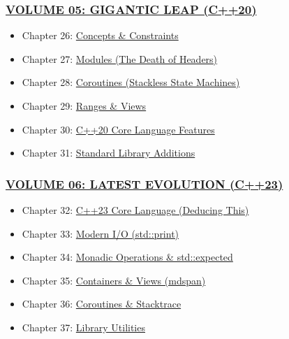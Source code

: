 \hypertarget{volume-05-gigantic-leap-c20}{%
\subsubsection{\texorpdfstring{\protect\hyperlink{volume-05-gigantic-leap-c20}{VOLUME
05: GIGANTIC LEAP
(C++20)}}{VOLUME 05: GIGANTIC LEAP (C++20)}}\label{volume-05-gigantic-leap-c20}}

\begin{itemize}
\tightlist
\item
  Chapter 26: \protect\hyperlink{chapter-26-c20-concepts}{Concepts \&
  Constraints}
\item
  Chapter 27: \protect\hyperlink{chapter-27-c20-modules}{Modules (The
  Death of Headers)}
\item
  Chapter 28: \protect\hyperlink{chapter-28-c20-coroutines}{Coroutines
  (Stackless State Machines)}
\item
  Chapter 29: \protect\hyperlink{chapter-29-c20-ranges}{Ranges \& Views}
\item
  Chapter 30:
  \protect\hyperlink{chapter-30-c20-core-language-features}{C++20 Core
  Language Features}
\item
  Chapter 31:
  \protect\hyperlink{chapter-31-c20-standard-library-additions}{Standard
  Library Additions}
\end{itemize}

\hypertarget{volume-06-latest-evolution-c23}{%
\subsubsection{\texorpdfstring{\protect\hyperlink{volume-06-latest-evolution-c23}{VOLUME
06: LATEST EVOLUTION
(C++23)}}{VOLUME 06: LATEST EVOLUTION (C++23)}}\label{volume-06-latest-evolution-c23}}

\begin{itemize}
\tightlist
\item
  Chapter 32: \protect\hyperlink{chapter-32-c23-core-language}{C++23
  Core Language (Deducing This)}
\item
  Chapter 33: \protect\hyperlink{chapter-33-c23-std-print}{Modern I/O
  (std::print)}
\item
  Chapter 34:
  \protect\hyperlink{chapter-34-c23-monadic-operations-and-expected}{Monadic
  Operations \& std::expected}
\item
  Chapter 35:
  \protect\hyperlink{chapter-35-c23-containers-and-views}{Containers \&
  Views (mdspan)}
\item
  Chapter 36:
  \protect\hyperlink{chapter-36-c23-coroutines-and-stacktrace}{Coroutines
  \& Stacktrace}
\item
  Chapter 37:
  \protect\hyperlink{chapter-37-c23-library-utilities}{Library
  Utilities}
\end{itemize}

